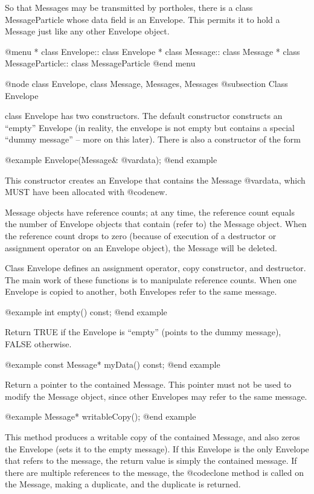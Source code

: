So that Messages may be transmitted by portholes, there is a class
MessageParticle whose data field is an Envelope.  This permits it to
hold a Message just like any other Envelope object.

@menu
* class Envelope::              class Envelope
* class Message::               class Message
* class MessageParticle::       class MessageParticle
@end menu

@node class Envelope, class Message, Messages, Messages
@subsection Class Envelope

class Envelope has two constructors.  The default constructor constructs
an ``empty'' Envelope (in reality, the envelope is not empty but contains
a special ``dummy message'' -- more on this later).  There is also a
constructor of the form

@example
Envelope(Message& @var{data});
@end example

This constructor creates an Envelope that contains the Message
@var{data}, which MUST have been allocated with @code{new}.

Message objects have reference counts; at any time, the reference count
equals the number of Envelope objects that contain (refer to) the
Message object.  When the reference count drops to zero (because of
execution of a destructor or assignment operator on an Envelope object),
the Message will be deleted.

Class Envelope defines an assignment operator, copy constructor, and
destructor.  The main work of these functions is to manipulate reference
counts.  When one Envelope is copied to another, both Envelopes refer
to the same message.

@example
int empty() const;
@end example

Return TRUE if the Envelope is ``empty'' (points to the dummy message),
FALSE otherwise.

@example
const Message* myData() const;
@end example

Return a pointer to the contained Message.  This pointer must not be
used to modify the Message object, since other Envelopes may refer to
the same message.

@example
Message* writableCopy();
@end example

This method produces a writable copy of the contained Message, and
also zeros the Envelope (sets it to the empty message).  If this
Envelope is the only Envelope that refers to the message, the
return value is simply the contained message.  If there are multiple
references to the message, the @code{clone} method is called on the
Message, making a duplicate, and the duplicate is returned.

